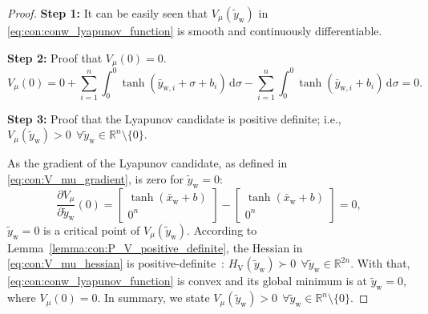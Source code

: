 \begin{proof}

    \textbf{Step 1:} 
    It can be easily seen that $V_\mu(\tilde{y}_\mathrm{w})$ in \eqref{eq:con:conw_lyapunov_function} is smooth and continuously differentiable.
    
    \textbf{Step 2:} Proof that $V_\mu(0) = 0$.
    \begin{equation}
        V_\mu(0) = 0 + \sum_{i=1}^n \int_{0}^{0} \tanh(\bar{y}_{\mathrm{w},i}+\sigma+b_i) \, \mathrm{d} \sigma - \sum_{i=1}^n \int_{0}^{0} \tanh(\bar{y}_{\mathrm{w},i}+b_i) \, \mathrm{d} \sigma = 0.
    \end{equation}
    
    \textbf{Step 3:} Proof that the Lyapunov candidate is positive definite; i.e., $V_\mu(\tilde{y}_\mathrm{w}) > 0 \: \: \forall \tilde{y}_\mathrm{w} \in \mathbb{R}^n \setminus \{0 \}$.
    
    As the gradient of the Lyapunov candidate, as defined in \eqref{eq:con:V_mu_gradient}, is zero for $\tilde{y}_\mathrm{w} = 0$: \begin{equation}
        \frac{\partial V_\mu}{\partial \tilde{y}_\mathrm{w}}(0) = \begin{bmatrix}
            \tanh(\bar{x}_\mathrm{w} + b)\\ 
            0^{n}
        \end{bmatrix} - \begin{bmatrix}
            \tanh(\bar{x}_\mathrm{w} + b)\\ 
            0^{n}
        \end{bmatrix} = 0,
    \end{equation}
    $\tilde{y}_\mathrm{w} = 0$ is a critical point of $V_\mu(\tilde{y}_\mathrm{w})$. 
    According to Lemma~\ref{lemma:con:P_V_positive_definite}, the Hessian in \eqref{eq:con:V_mu_hessian} is positive-definite~\citep{boyd2004convex}: $H_\mathrm{V}(\tilde{y}_\mathrm{w}) \succ 0 \: \: \forall \tilde{y}_\mathrm{w} \in \mathbb{R}^{2n}$.
    With that, \eqref{eq:con:conw_lyapunov_function} is convex and its global minimum is at $\tilde{y}_\mathrm{w} = 0$, where $V_\mu(0) = 0$. In summary, we state $V_\mu(\tilde{y}_\mathrm{w}) > 0 \: \: \forall \tilde{y}_\mathrm{w} \in \mathbb{R}^n \setminus \{0 \}$.


\end{proof}
